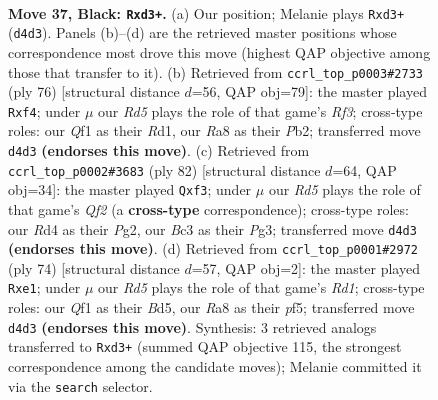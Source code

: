 \documentclass[11pt]{article}
\begin{document}
\clearpage

\begin{figure}[p]\centering
\begin{subfigure}{0.46\textwidth}\centering
\resizebox{\linewidth}{!}{%
\newchessgame
\chessboard[
  setfen={r7/p6Q/2k1p3/p2p4/3r2P1/2bR2K1/2P5/5q2 b - - 7 37},
  showmover=false,
  pgfstyle=straightmove, color=movearrow, markmove={d4-d3}
]}
\caption{}
\end{subfigure}\hfill
\begin{subfigure}{0.46\textwidth}\centering
\resizebox{\linewidth}{!}{%
\newchessgame
\chessboard[
  setfen={3r2k1/1p6/p2P2pb/P7/5rB1/5R2/1P3P1P/3R3K w - - 5 39},
  showmover=false,
  pgfstyle=straightmove, color=movearrow, markmove={f3-f4}
]}
\caption{}
\end{subfigure}
\\[4pt]
\begin{subfigure}{0.46\textwidth}\centering
\resizebox{\linewidth}{!}{%
\newchessgame
\chessboard[
  setfen={2r4k/6p1/7p/1P1q4/R7/5rPP/5QPK/8 w - - 0 42},
  showmover=false,
  pgfstyle=straightmove, color=movearrow, markmove={f2-f3}
]}
\caption{}
\end{subfigure}\hfill
\begin{subfigure}{0.46\textwidth}\centering
\resizebox{\linewidth}{!}{%
\newchessgame
\chessboard[
  setfen={7k/3b3p/QP6/2pB1p2/8/1P4q1/6P1/3Rr1K1 w - - 1 38},
  showmover=false,
  pgfstyle=straightmove, color=movearrow, markmove={d1-e1}
]}
\caption{}
\end{subfigure}
\caption{\textbf{Move 37, Black: \texttt{Rxd3+}.} (a) Our position; Melanie plays \texttt{Rxd3+} (\texttt{d4d3}). Panels (b)--(d) are the retrieved master positions whose correspondence most drove this move (highest QAP objective among those that transfer to it). (b) Retrieved from \texttt{ccrl\_top\_p0003\#2733} (ply 76) [structural distance $d$=56, QAP obj=79]: the master played \texttt{Rxf4}; under $\mu$ our \emph{Rd5} plays the role of that game's \emph{Rf3}; cross-type roles: our \emph{Q}f1 as their \emph{R}d1, our \emph{R}a8 as their \emph{P}b2; transferred move \texttt{d4d3} \textbf{(endorses this move)}. (c) Retrieved from \texttt{ccrl\_top\_p0002\#3683} (ply 82) [structural distance $d$=64, QAP obj=34]: the master played \texttt{Qxf3}; under $\mu$ our \emph{Rd5} plays the role of that game's \emph{Qf2} (a \textbf{cross-type} correspondence); cross-type roles: our \emph{R}d4 as their \emph{P}g2, our \emph{B}c3 as their \emph{P}g3; transferred move \texttt{d4d3} \textbf{(endorses this move)}. (d) Retrieved from \texttt{ccrl\_top\_p0001\#2972} (ply 74) [structural distance $d$=57, QAP obj=2]: the master played \texttt{Rxe1}; under $\mu$ our \emph{Rd5} plays the role of that game's \emph{Rd1}; cross-type roles: our \emph{Q}f1 as their \emph{B}d5, our \emph{R}a8 as their \emph{p}f5; transferred move \texttt{d4d3} \textbf{(endorses this move)}. Synthesis: 3 retrieved analogs transferred to \texttt{Rxd3+} (summed QAP objective 115, the strongest correspondence among the candidate moves); Melanie committed it via the \texttt{search} selector.}
\label{fig:thought-m73}
\end{figure}
\end{document}
